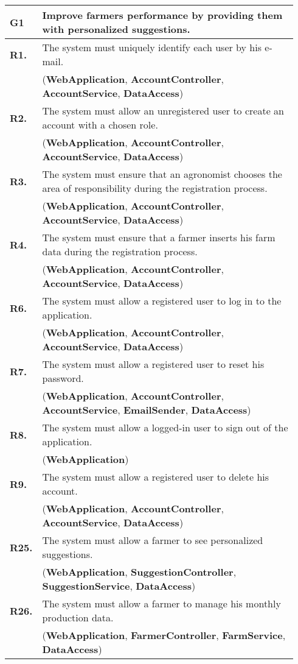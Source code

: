 \begin{longtable}{p{0.06\linewidth} p{0.88\linewidth}} 
    \toprule
    \textbf{G1} & Improve farmers performance by providing them with personalized suggestions. \\
    \midrule		
	\textbf{R1.} & The system must uniquely identify each user by his e-mail. \\
	& (\textbf{WebApplication}, \textbf{AccountController}, \textbf{AccountService}, \textbf{DataAccess})\\
	\textbf{R2.} & The system must allow an unregistered user to create an account with a chosen role. \\
    & (\textbf{WebApplication}, \textbf{AccountController}, \textbf{AccountService}, \textbf{DataAccess})\\
	\textbf{R3.} & The system must ensure that an agronomist chooses the area of responsibility during the registration process. \\
	& (\textbf{WebApplication}, \textbf{AccountController}, \textbf{AccountService}, \textbf{DataAccess})\\
	\textbf{R4.} & The system must ensure that a farmer inserts his farm data during the registration process.\\
	& (\textbf{WebApplication}, \textbf{AccountController}, \textbf{AccountService}, \textbf{DataAccess})\\
	\textbf{R6.} & The system must allow a registered user to log in to the application. \\
	& (\textbf{WebApplication}, \textbf{AccountController}, \textbf{AccountService}, \textbf{DataAccess})\\
	\textbf{R7.} & The system must allow a registered user to reset his password. \\
	& (\textbf{WebApplication}, \textbf{AccountController}, \textbf{AccountService}, \textbf{EmailSender}, \textbf{DataAccess})\\
	\textbf{R8.} & The system must allow a logged-in user to sign out of the application.\\
	& (\textbf{WebApplication})\\
	\textbf{R9.} & The system must allow a registered user to delete his account. \\
	& (\textbf{WebApplication}, \textbf{AccountController}, \textbf{AccountService}, \textbf{DataAccess})\\
	
	\textbf{R25.} & The system must allow a farmer to see personalized suggestions.\\
	& (\textbf{WebApplication}, \textbf{SuggestionController}, \textbf{SuggestionService}, \textbf{DataAccess})\\
	\textbf{R26.} & The system must allow a farmer to manage his monthly production data.\\
	& (\textbf{WebApplication}, \textbf{FarmerController}, \textbf{FarmService}, \textbf{DataAccess})\\
	

\end{longtable}
